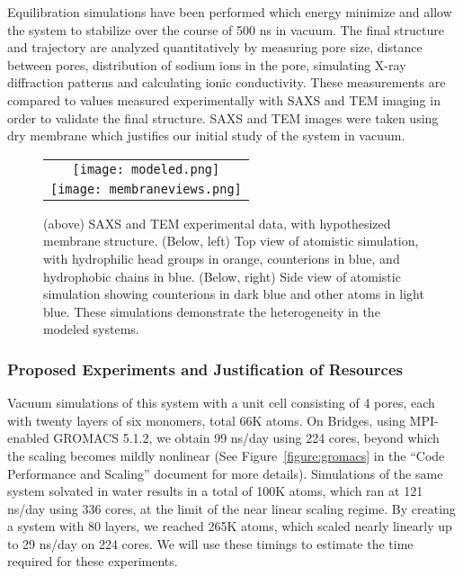 Equilibration simulations have been performed which energy minimize and
allow the system to stabilize over the course of 500 ns in vacuum.  The
final structure and trajectory are analyzed quantitatively by
measuring pore size, distance between pores, distribution of
sodium ions in the pore, simulating X-ray diffraction patterns and 
calculating ionic conductivity. These measurements are compared to values
measured experimentally with SAXS and TEM imaging in order to validate
the final structure. SAXS and TEM images were taken using dry membrane
which justifies our initial study of the system in vacuum.

\begin{figure}[h]
\begin{center}
\begin{tabular}{c}
\texttt{[image: modeled.png]}\\
\texttt{[image: membraneviews.png]}\\
\end{tabular}
\end{center}
\caption{(above) SAXS and TEM experimental data, with hypothesized
  membrane structure. (Below, left) Top view of atomistic simulation,
  with hydrophilic head groups in orange, counterions in blue, and
  hydrophobic chains in blue. (Below, right) Side view of atomistic
  simulation showing counterions in dark blue and other atoms in light
  blue. These simulations demonstrate the heterogeneity in the
  modeled systems.~\label{figure:membrane}}
\end{figure}

\subsubsection*{Proposed Experiments and Justification of Resources}

Vacuum simulations of this system with a unit cell consisting of 4
pores, each with twenty layers of six monomers, total 66K atoms. On
Bridges, using MPI-enabled GROMACS 5.1.2, we obtain
99 ns/day using 224 cores, beyond which the scaling becomes mildly
nonlinear (See Figure~\ref{figure:gromacs} in the ``Code Performance
and Scaling'' document for more details). Simulations of the same
system solvated in water results in a total of 100K atoms, which ran
at 121 ns/day using 336 cores, at the limit of the near linear scaling
regime.  By creating a system with 80 layers, we reached 265K atoms,
which scaled nearly linearly up to 29 ns/day on 224 cores. We will use
these timings to estimate the time required for these experiments.

